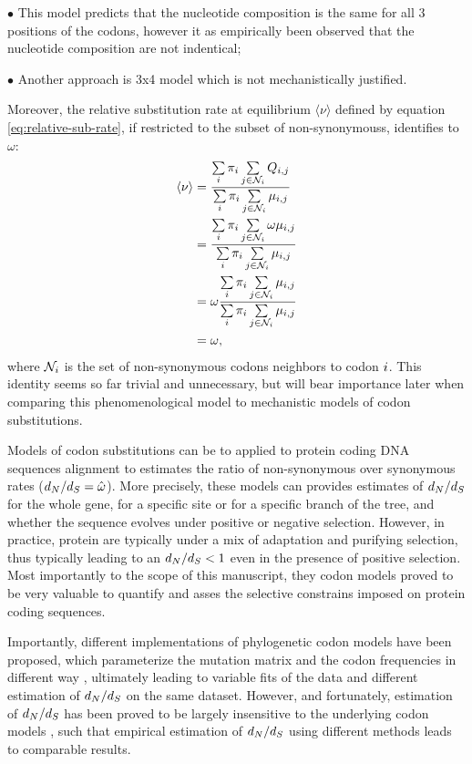 $\bullet$ This model predicts that the nucleotide composition is the same for all $3$ positions of the codons, however it as empirically been observed that the nucleotide composition are not indentical;

$\bullet$ Another approach is 3x4 model which is not mechanistically justified.

Moreover, the relative \gls{substitution} rate at equilibrium $\langle \nu \rangle$ defined by equation \ref{eq:relative-sub-rate}, if restricted to the subset of \glspl{non-synonymous}, identifies to $\omega$:
\begin{align}
\langle \nu \rangle & = \dfrac{ \sum\limits_{{i}} \pi_{{i}} \sum\limits_{{j} \in \mathcal{N}_{{i}}} Q_{{i}, {j}}}{\sum\limits_{{i}} \pi_{{i}} \sum\limits_{{j} \in \mathcal{N}_{{i}}} \mu_{{i}, {j}}} \\
					& = \dfrac{ \sum\limits_{{i}} \pi_{{i}} \sum\limits_{{j} \in \mathcal{N}_{{i}}} \omega \mu_{{i}, {j}}}{\sum\limits_{{i}} \pi_{{i}} \sum\limits_{{j} \in \mathcal{N}_{{i}}} \mu_{{i}, {j}}} \\
					& = \omega \dfrac{ \sum\limits_{{i}} \pi_{{i}} \sum\limits_{{j} \in \mathcal{N}_{{i}}} \mu_{{i}, {j}}}{\sum\limits_{{i}} \pi_{{i}} \sum\limits_{{j} \in \mathcal{N}_{{i}}} \mu_{{i}, {j}}} \\
					& = \omega, 
\end{align}
where $\mathcal{N}_{{i}}$ is the set of non-synonymous \glspl{codon} neighbors to \gls{codon} ${i}$.
This identity seems so far trivial and unnecessary, but will bear importance later when comparing this phenomenological model to mechanistic models of \gls{codon} \glspl{substitution}.


Models of \gls{codon} \glspl{substitution} can be to applied to protein coding \acrshort{DNA} sequences alignment to estimates the ratio of non-synonymous over \gls{synonymous} rates ($d_N / d_S=\hat{\omega}$).
More precisely, these models can provides estimates of $d_N / d_S$ for the whole gene, for a specific site or for a specific branch of the tree, and whether the sequence evolves under positive or negative selection.
However, in practice, protein are typically under a mix of adaptation and purifying selection, thus typically leading to an $d_N / d_S<1$ even in the presence of positive selection.
Most importantly to the scope of this manuscript, they \gls{codon} models proved to be very valuable to quantify and asses the selective constrains imposed on protein coding sequences.

Importantly, different implementations of phylogenetic \gls{codon} models have been proposed, which parameterize the mutation matrix and the \gls{codon} frequencies in different way \citep{Muse1994, Goldman1994}, ultimately leading to variable fits of the data and different estimation of $d_N / d_S$ on the same dataset. 
However, and fortunately, estimation of $d_N / d_S$ has been proved to be largely insensitive to the underlying \gls{codon} models \citep{Spielman2018}, such that empirical estimation of $d_N / d_S$ using different methods leads to comparable results.

